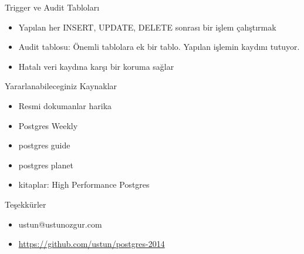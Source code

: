\documentclass[presentation]{beamer}
\begin{document}
\begin{frame}[label=sec-37]{Trigger ve Audit Tabloları}
\begin{itemize}
\item Yapılan her INSERT, UPDATE, DELETE sonrası bir işlem çalıştırmak
\item Audit tablosu: Önemli tablolara ek bir tablo. Yapılan işlemin kaydını
tutuyor.
\item Hatalı veri kaydına karşı bir koruma sağlar
\end{itemize}
\end{frame}

\begin{frame}[label=sec-38]{Yararlanabileceginiz Kaynaklar}
\begin{itemize}
\item Resmi dokumanlar harika
\item Postgres Weekly
\item postgres guide
\item postgres planet
\item kitaplar: High Performance Postgres
\end{itemize}
\end{frame}


\begin{frame}[label=sec-39]{Teşekkürler}
\begin{itemize}
\item ustun@ustunozgur.com
\item \url{https://github.com/ustun/postgres-2014}
\end{itemize}
\end{frame}
\end{document}

